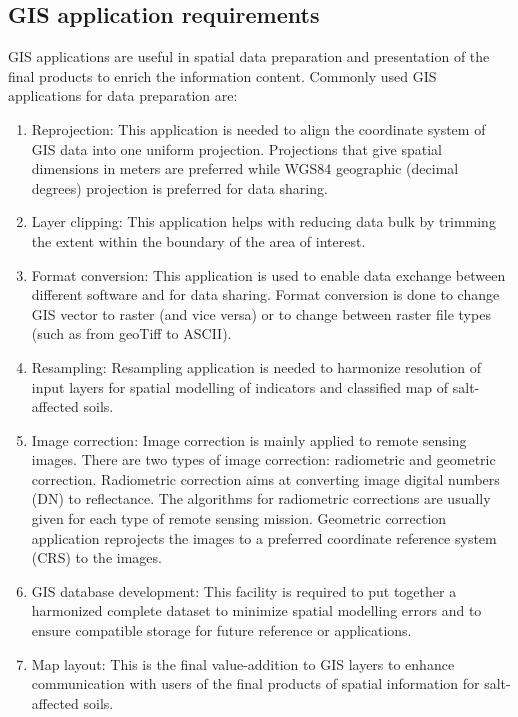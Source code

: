 \documentclass[
  10pt,
  b5paper,
]{book}
\providecommand{\tightlist}{%
  \setlength{\itemsep}{0pt}\setlength{\parskip}{0pt}}
\begin{document}
\hypertarget{gis-application-requirements}{%
\subsection{GIS application requirements}\label{gis-application-requirements}}

GIS applications are useful in spatial data preparation and presentation of the final products to enrich the information content. Commonly used GIS applications for data preparation are:

\begin{enumerate}
\def\labelenumi{\alph{enumi})}
\tightlist
\item
  Reprojection: This application is needed to align the coordinate system of GIS data into one uniform projection. Projections that give spatial dimensions in meters are preferred while WGS84 geographic (decimal degrees) projection is preferred for data sharing.\\
\item
  Layer clipping: This application helps with reducing data bulk by trimming the extent within the boundary of the area of interest.\\
\item
  Format conversion: This application is used to enable data exchange between different software and for data sharing. Format conversion is done to change GIS vector to raster (and vice versa) or to change between raster file types (such as from geoTiff to ASCII).
\item
  Resampling: Resampling application is needed to harmonize resolution of input layers for spatial modelling of indicators and classified map of salt-affected soils.\\
\item
  Image correction: Image correction is mainly applied to remote sensing images. There are two types of image correction: radiometric and geometric correction. Radiometric correction aims at converting image digital numbers (DN) to reflectance. The algorithms for radiometric corrections are usually given for each type of remote sensing mission. Geometric correction application reprojects the images to a preferred coordinate reference system (CRS) to the images.\\
\item
  GIS database development: This facility is required to put together a harmonized complete dataset to minimize spatial modelling errors and to ensure compatible storage for future reference or applications.\\
\item
  Map layout: This is the final value-addition to GIS layers to enhance communication with users of the final products of spatial information for salt-affected soils.
\end{enumerate}
\end{document}
